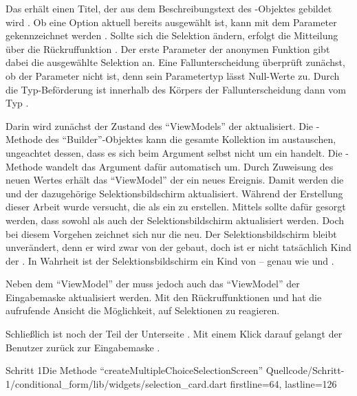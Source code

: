 Das  erhält einen Titel, der aus dem Beschreibungstext  des -Objektes gebildet wird .
Ob eine Option aktuell bereits ausgewählt ist, kann mit dem Parameter  gekennzeichnet werden .
Sollte sich die Selektion ändern, erfolgt die Mitteilung über die Rückruffunktion  .
Der erste Parameter der anonymen Funktion gibt dabei die ausgewählte Selektion an.
Eine Fallunterscheidung überprüft zunächst, ob der Parameter  nicht  ist, denn sein Parametertyp  lässt Null-Werte zu.
Durch die Typ-Beförderung ist  innerhalb des Körpers der Fallunterscheidung dann vom Typ  . 


Darin wird zunächst der Zustand des \enquote{ViewModels} der  aktualisiert.
Die -Methode des \enquote{Builder}-Objektes kann die gesamte Kollektion im  austauschen, ungeachtet dessen, dass es sich beim Argument selbst nicht um ein  handelt.
Die -Methode wandelt das Argument dafür automatisch um.
Durch Zuweisung des neuen Wertes erhält das \enquote{ViewModel} der  ein neues Ereignis.
Damit werden die  und der dazugehörige Selektionsbildschirm aktualisiert.
Während der Erstellung dieser Arbeit wurde versucht, die  als ein  zu erstellen.
Mittels  sollte dafür gesorgt werden, dass sowohl  als auch der Selektionsbildschirm aktualisiert werden.
Doch bei diesem Vorgehen zeichnet sich nur die  neu.
Der Selektionsbildschirm bleibt unverändert, denn er wird zwar von der  gebaut, doch ist er nicht tatsächlich Kind der .
In Wahrheit ist der Selektionsbildschirm ein Kind von  -- genau wie  und .

Neben dem \enquote{ViewModel} der  muss jedoch auch das \enquote{ViewModel} der Eingabemaske aktualisiert werden.
Mit den Rückruffunktionen   und   hat die aufrufende Ansicht die Möglichkeit, auf Selektionen zu reagieren.

Schließlich ist noch der  Teil der Unterseite .
Mit einem Klick darauf gelangt der Benutzer zurück zur Eingabemaske .


\begin{alexlisting}{Schritt 1}{Die Methode \enquote{createMultipleChoiceSelectionScreen}}
  {Quellcode/Schritt-1/conditional_form/lib/widgets/selection_card.dart}
  {firstline=64, lastline=126}
  \label{lst:Schritt1FunktionCreateMultipleChoiceSelectionScreen}
\end{alexlisting}
 